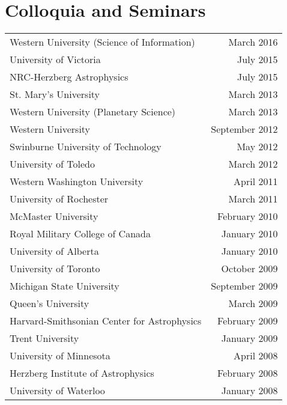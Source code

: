 \documentclass[12pt]{article}
\begin{document}
\section{Colloquia and Seminars}
\begin{tabularx}{\textwidth}{Xr}
Western University (Science of Information)& March 2016\\ %
University of Victoria& July 2015\\ %
NRC-Herzberg Astrophysics& July 2015\\ %
St. Mary's University& March 2013\\ %
Western University (Planetary Science)& March 2013\\ %
Western University& September 2012\\ %
Swinburne University of Technology& May 2012\\  %
University of Toledo& March 2012\\ %
Western Washington University& April 2011\\ %
University of Rochester& March 2011\\ %
McMaster University&  February 2010\\ %
Royal Military College of Canada& January 2010\\ %
University of Alberta& January 2010\\ %
University of Toronto&  October 2009\\%
Michigan State University& September 2009\\%
Queen's University& March 2009\\ %
Harvard-Smithsonian Center for Astrophysics& February 2009\\ %
Trent University& January 2009\\ %
University of Minnesota& April 2008\\ %
Herzberg Institute of Astrophysics& February 2008\\ %
University of Waterloo& January 2008\\ %

\end{tabularx}
\end{document}
